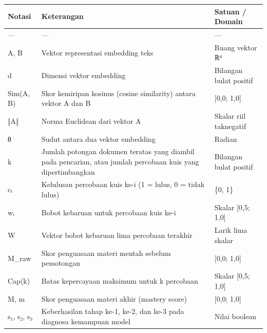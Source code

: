 \documentclass[12pt,a4paper]{article}
\begin{document}
\begin{table}[h]

\centering

\begin{tabular}{lll}

\toprule

Notasi & Keterangan & Satuan / Domain \\

\midrule

--- & --- & --- \\

A, B & Vektor representasi embedding teks & Ruang vektor ℝᵈ \\

d & Dimensi vektor embedding & Bilangan bulat positif \\

Sim(A, B) & Skor kemiripan kosinus (cosine similarity) antara vektor A dan B & {[}0,0; 1,0{]} \\

‖A‖ & Norma Euclidean dari vektor A & Skalar riil taknegatif \\

θ & Sudut antara dua vektor embedding & Radian \\

k & Jumlah potongan dokumen teratas yang diambil pada pencarian, atau jumlah percobaan kuis yang dipertimbangkan & Bilangan bulat positif \\

cᵢ & Kelulusan percobaan kuis ke-i (1 = lulus, 0 = tidak lulus) & \{0, 1\} \\

wᵢ & Bobot kebaruan untuk percobaan kuis ke-i & Skalar {[}0,5; 1,0{]} \\

W & Vektor bobot kebaruan lima percobaan terakhir & Larik lima skalar \\

M\_raw & Skor penguasaan materi mentah sebelum pemotongan & {[}0,0; 1,0{]} \\

Cap(k) & Batas kepercayaan maksimum untuk k percobaan & Skalar {[}0,5; 1,0{]} \\

M, m & Skor penguasaan materi akhir (mastery score) & {[}0,0; 1,0{]} \\

s₁, s₂, s₃ & Keberhasilan tahap ke-1, ke-2, dan ke-3 pada diagnosa kemampuan model & Nilai boolean \\

\bottomrule

\end{tabular}

\end{table}
\end{document}
